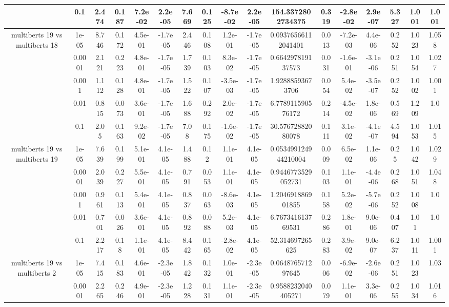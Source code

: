\begin{tabular}{|c|c|c|c|c|c|c|c|c|c|c|c|c|c|c|c|c|}
 & 0.1 & 2.474 & 0.187 & 7.2e-02 & 2.2e-05 & 7.669 & 0.125 & -8.7e-02 & 2.2e-05 & 154.3372802734375 & 0.319 & -2.8e-02 & 2.9e-07 & 5.327 & 1.001 & 1.001 \\
\hline
\multirow{5}{*}{multiberts 19 vs multiberts 18} & 1e-05 & 8.746 & 0.172 & 4.5e-01 & -1.7e-05 & 2.446 & 0.108 & 1.2e-01 & -1.7e-05 & 0.09376566112041401 & 0.013 & -7.2e-03 & 4.4e-06 & 0.252 & 1.023 & 1.058 \\
 & 0.0001 & 2.121 & 0.223 & 4.8e-01 & -1.7e-05 & 1.739 & 0.103 & 8.3e-02 & -1.7e-05 & 0.664297819137573 & 0.031 & -1.6e-01 & -3.1e-06 & 0.251 & 1.054 & 1.027 \\
 & 0.001 & 1.112 & 0.128 & 4.8e-01 & -1.7e-05 & 1.522 & 0.107 & -3.5e-03 & -1.7e-05 & 1.92888593673706 & 0.054 & 5.4e-02 & -3.5e-07 & 0.252 & 1.002 & 1.001 \\
 & 0.01 & 0.815 & 0.073 & 3.6e-01 & -1.7e-05 & 1.688 & 0.292 & 2.0e-02 & -1.7e-05 & 6.778911590576172 & 0.214 & -4.5e-02 & 1.8e-06 & 0.569 & 1.209 & 1.0 \\
 & 0.1 & 2.05 & 0.163 & 9.2e-02 & -1.7e-05 & 7.08 & 0.175 & -1.6e-02 & -1.7e-05 & 30.57672882080078 & 0.111 & 3.1e-02 & -4.1e-07 & 4.594 & 1.053 & 1.015 \\
\hline
\multirow{5}{*}{multiberts 19 vs multiberts 19} & 1e-05 & 7.639 & 0.199 & 5.1e-01 & 4.1e-05 & 1.488 & 0.12 & 1.1e-01 & 4.1e-05 & 0.053499124944210004 & 0.009 & 6.5e-02 & 1.1e-06 & 0.25 & 1.042 & 1.029 \\
 & 0.0001 & 2.039 & 0.227 & 5.5e-01 & 4.1e-05 & 0.791 & 0.053 & 1.1e-01 & 4.1e-05 & 0.9446773529052731 & 0.103 & 1.1e-01 & -4.4e-06 & 0.268 & 1.051 & 1.048 \\
 & 0.001 & 0.961 & 0.113 & 5.4e-01 & 4.1e-05 & 0.837 & 0.063 & -8.6e-03 & 4.1e-05 & 1.204691886901855 & 0.158 & 5.2e-02 & -5.7e-06 & 0.252 & 1.008 & 1.0 \\
 & 0.01 & 0.701 & 0.026 & 3.6e-01 & 4.1e-05 & 0.892 & 0.088 & 5.2e-03 & 4.1e-05 & 6.767341613769531 & 0.286 & 1.8e-01 & 9.0e-06 & 0.407 & 1.01 & 1.0 \\
 & 0.1 & 2.217 & 0.18 & 1.1e-01 & 4.1e-05 & 8.442 & 0.165 & -2.8e-02 & 4.1e-05 & 52.314697265625 & 0.283 & 3.9e-02 & 9.0e-07 & 6.237 & 1.011 & 1.001 \\
\hline
\multirow{5}{*}{multiberts 19 vs multiberts 2} & 1e-05 & 7.415 & 0.183 & 4.6e-01 & -2.3e-05 & 1.842 & 0.132 & 1.0e-01 & -2.3e-05 & 0.064876571297645 & 0.006 & -6.9e-02 & -2.6e-06 & 0.251 & 1.023 & 1.03 \\
 & 0.0001 & 2.265 & 0.246 & 4.9e-01 & -2.3e-05 & 1.228 & 0.131 & 1.1e-01 & -2.3e-05 & 0.9588232040405271 & 0.079 & 1.1e-01 & 3.3e-06 & 0.255 & 1.034 & 1.016 \\

\end{tabular}
